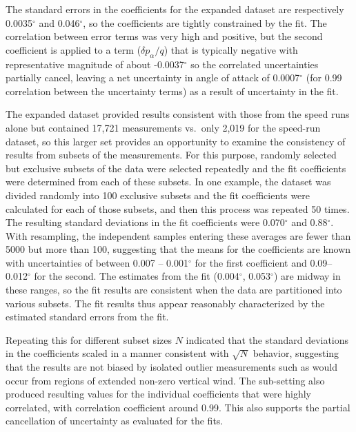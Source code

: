 \documentclass[12pt,twoside,english]{article}\usepackage[]{graphicx}\usepackage[]{color}
\let\OrgIndex\index
\renewcommand*{\index}[1]{\OrgIndex{#1}}
\begin{document}
The standard errors in the coefficients for the expanded dataset are respectively 0.0035$^{\circ}$ and 0.046$^{\circ}$, so the coefficients are tightly constrained by the fit.  The correlation between error terms was very high and positive, but the second coefficient is applied to a term ($\delta p_{\alpha}/q$) that is typically negative with representative magnitude of about -0.0037$^{\circ}$ so the correlated uncertainties partially cancel, leaving a net uncertainty in angle of attack of 0.0007$^{\circ}$ (for 0.99 correlation between the uncertainty terms) as a result of uncertainty in the fit. 

The expanded dataset provided results consistent with those from the speed runs alone but contained 17,721 measurements vs.~only 2,019 for the speed-run dataset, so this larger set provides an opportunity to examine the consistency of results from subsets of the measurements. For this purpose, randomly selected but exclusive subsets of the data were selected repeatedly and the fit coefficients were determined from each of these subsets. In one example, the dataset was divided randomly into 100 exclusive subsets and the fit coefficients were calculated for each of those subsets, and then this process was repeated 50 times. The resulting standard deviations in the fit coefficients were 0.070$^{\circ}$ and 0.88$^{\circ}$. With resampling, the independent samples entering these averages are fewer than 5000 but more than 100, suggesting that the means for the coefficients are known with uncertainties of between 0.007 -- 0.001$^{\circ}$ for the first coefficient and 0.09--0.012$^{\circ}$ for the second. The estimates from the fit (0.004$^{\circ}$, 0.053$^{\circ}$) are midway in these ranges, so the fit results are consistent when the data are partitioned into various subsets. The fit results thus appear reasonably characterized by the estimated standard errors from the fit. 

Repeating this for different subset sizes $N$ indicated that the standard deviations in the coefficients scaled in a manner consistent with $\sqrt{N}$ behavior, suggesting that the results are not biased by isolated outlier measurements such as would occur from regions of extended non-zero vertical wind. The sub-setting also produced resulting values for the individual coefficients that were highly correlated, with correlation coefficient around 0.99. This also supports the partial cancellation of uncertainty as evaluated for the fits. 
\end{document}
